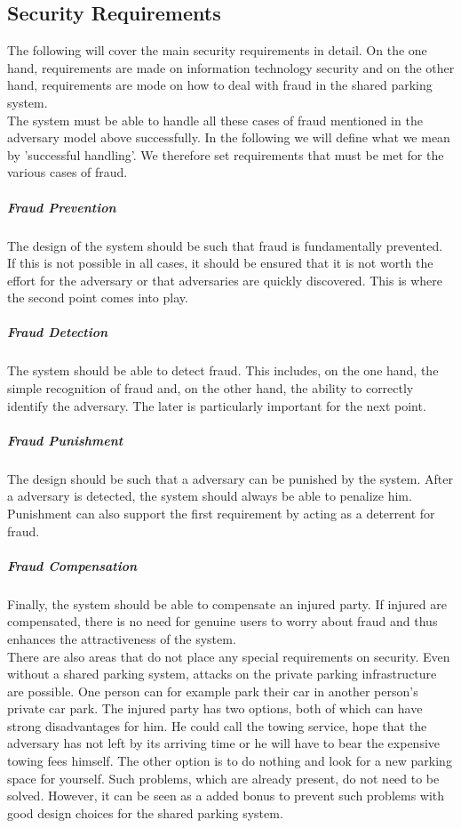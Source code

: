 \documentclass[
a4paper,     %
titlepage,   %
14pt         %
]{scrartcl}  %
\theoremstyle{mystyle}
\begin{document}
\subsection{Security Requirements}
The following will cover the main security requirements in detail. On the one hand, requirements are made on information technology security and on the other hand, requirements are mode on how to deal with fraud in the shared parking system. \\

The system must be able to handle all these cases of fraud mentioned in the adversary model above successfully. In the following we will define what we mean by 'successful handling'. We therefore set requirements that must be met for the various cases of fraud.
\subparagraph{Fraud Prevention} The design of the system should be such that fraud is fundamentally prevented. If this is not possible in all cases, it should be ensured that it is not worth the effort for the adversary or that adversaries are quickly discovered. This is where the second point comes into play.
\subparagraph{Fraud Detection} The system should be able to detect fraud. This includes, on the one hand, the simple recognition of fraud and, on the other hand, the ability to correctly identify the adversary. The later is particularly important for the next point.
\subparagraph{Fraud Punishment} The design should be such that a adversary can be punished by the system. After a adversary is detected, the system should always be able to penalize him. Punishment can also support the first requirement by acting as a deterrent for fraud.
\subparagraph{Fraud Compensation} Finally, the system should be able to compensate an injured party. If injured are compensated, there is no need for genuine users to worry about fraud and thus enhances the attractiveness of the system.\\

There are also areas that do not place any special requirements on security. Even without a shared parking system, attacks on the private parking infrastructure are possible. One person can for example park their car in another person's private car park. The injured party has two options, both of which can have strong disadvantages for him. He could call the towing service, hope that the adversary has not left by its arriving time or he will have to bear the expensive towing fees himself. The other option is to do nothing and look for a new parking space for yourself. Such problems, which are already present, do not need to be solved. However, it can be seen as a added bonus to prevent such problems with good design choices for the shared parking system.
\end{document}
